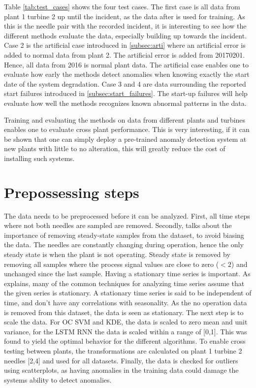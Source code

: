         Table \ref{tab:test_cases} shows the four test cases. The first case is all data from plant 1 turbine 2 up until the incident, as the data after is used for training. As this is the needle pair with the recorded incident, it is interesting to see how the different methods evaluate the data, especially building up towards the incident. Case 2 is the artificial case introduced in \ref{subsec:arti} where an artificial error is added to normal data from plant 2. The artificial error is added from 20170201. Hence, all data from 2016 is normal plant data. The artificial case enables one to evaluate how early the methods detect anomalies when knowing exactly the start date of the system degradation. Case 3 and 4 are data surrounding the reported start failures introduced in \ref{subsec:start_failures}. The start-up failures will help evaluate how well the methods recognizes known abnormal patterns in the data. 
        
        Training and evaluating the methods on data from different plants and turbines enables one to evaluate cross plant performance. This is very interesting, if it can be shown that one can simply deploy a pre-trained anomaly detection system at new plants with little to no alteration, this will greatly reduce the cost of installing such systems. 
        
        
        
    \section{Prepossessing steps}
        The data needs to be preprocessed before it can be analyzed. First, all time steps where not both needles are sampled are removed. Secondly, \cite{Tarassenko2009} talks about the importance of removing steady-state samples from the dataset, to avoid biasing the data.  The needles are constantly changing during operation, hence the only steady state is when the plant is not operating. Steady state is removed by removing all samples where the process signal values are close to zero ($<2$) and unchanged since the last sample. Having a stationary time series is important. As \cite{Manuca1996} explains, many of the common techniques for analyzing time series assume that the given series is stationary. A stationary time series is said to be independent of time, and don't have any correlations with seasonality. As the no operation data is removed from this dataset, the data is seen as stationary. The next step is to scale the data. For OC SVM and KDE, the data is scaled to zero mean and unit variance, for the LSTM RNN the data is scaled within a range of [0,1]. This was found to yield the optimal behavior for the different algorithms. To enable cross testing between plants, the transformations are calculated on plant 1 turbine 2 needles [2,4] and used for all datasets. Finally, the data is checked for outliers using scatterplots, as having anomalies in the training data could damage the systems ability to detect anomalies. 
    
